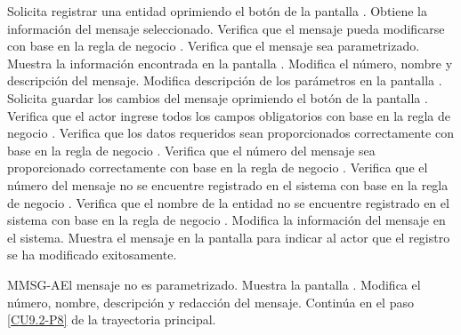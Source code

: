 	\begin{UCtrayectoria}
		\UCpaso[\UCactor] Solicita registrar una entidad oprimiendo el botón \editar de la pantalla .
		\UCpaso[\UCsist] Obtiene la información del mensaje seleccionado.
		\UCpaso[\UCsist] Verifica que el mensaje pueda modificarse con base en la regla de negocio . 
		\UCpaso[\UCsist] Verifica que el mensaje sea parametrizado.
		\UCpaso[\UCsist] Muestra la información encontrada en la pantalla . 
		\UCpaso[\UCactor] Modifica el número, nombre y descripción del mensaje. \label{CU9.2-P6}
		\UCpaso[\UCactor] Modifica descripción de los parámetros en la pantalla .
		\UCpaso[\UCactor] Solicita guardar los cambios del mensaje oprimiendo el botón  de la pantalla . \label{CU9.2-P8}  
		\UCpaso[\UCsist] Verifica que el actor ingrese todos los campos obligatorios con base en la regla de negocio . 
		\UCpaso[\UCsist] Verifica que los datos requeridos sean proporcionados correctamente con base en la regla de negocio .  
		\UCpaso[\UCsist] Verifica que el número del mensaje sea proporcionado correctamente con base en la regla de negocio . 
		\UCpaso[\UCsist] Verifica que el número del mensaje no se encuentre registrado en el sistema con base en la regla de negocio . 
		\UCpaso[\UCsist] Verifica que el nombre de la entidad no se encuentre registrado en el sistema con base en la regla de negocio .  
		\UCpaso[\UCsist] Modifica la información del mensaje en el sistema.
		\UCpaso[\UCsist] Muestra el mensaje  en la pantalla  para indicar al actor que el registro se ha modificado exitosamente.
	\end{UCtrayectoria}		
	
	\begin{UCtrayectoriaA}{MMSG-A}{El mensaje no es parametrizado.}
		\UCpaso[\UCsist] Muestra la pantalla .
		\UCpaso[\UCactor] Modifica el número, nombre, descripción y redacción del mensaje. \label{CU9.2-AP-2}
		\UCpaso[\UCsist] Continúa en el paso \ref{CU9.2-P8} de la trayectoria principal.
	\end{UCtrayectoriaA}


